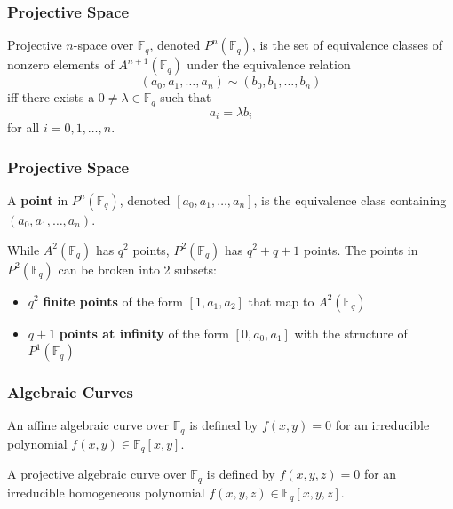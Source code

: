 \documentclass{beamer}
\begin{document}
    \begin{frame}
        \frametitle{Projective Space}
        \begin{definition}
            Projective \(n\)-space over \(\mathbb{F}_q\), denoted
            \(P^n(\mathbb{F}_q)\), is the set of equivalence classes of
            nonzero elements of \(A^{n+1}(\mathbb{F}_q)\) under the
            equivalence relation
            \[(a_0, a_1, \dots, a_n) \sim (b_0, b_1, \dots, b_n)\] iff there
            exists a \(0 \neq \lambda \in \mathbb{F}_q\) such that
            \[a_i = \lambda b_i\] for all \(i = 0, 1, \dots, n\).
        \end{definition}
    \end{frame}

    \begin{frame}
        \frametitle{Projective Space}
        \begin{definition}
            A \textbf{point} in \(P^n(\mathbb{F}_q)\), denoted
            \([a_0, a_1, \dots, a_n]\), is the equivalence class
            containing \((a_0, a_1, \dots, a_n)\).
        \end{definition}
        \vfill
        While \(A^2(\mathbb{F}_q)\) has \(q^2\) points,
        \(P^2(\mathbb{F}_q)\) has \(q^2 + q + 1\) points.
        \vfill
        The points in \(P^2(\mathbb{F}_q)\) can be broken into 2 subsets:
        \begin{itemize}
            \item \(q^2\) \textbf{finite points} of the form \([1, a_1, a_2]\)
            that map to \(A^2(\mathbb{F}_q)\)
            \item \(q+1\) \textbf{points at infinity} of the
            form \([0, a_0, a_1]\)
            with the structure of \(P^1(\mathbb{F}_q)\)
        \end{itemize}
    \end{frame}

    \begin{frame}
        \frametitle{Algebraic Curves}
        \begin{definition}
            An affine algebraic curve over \(\mathbb{F}_q\) is defined by
            \(f(x, y) = 0\) for an irreducible polynomial
            \(f(x, y) \in \mathbb{F}_q[x, y]\).
        \end{definition}
        \vfill
        \begin{definition}
            A projective algebraic curve over \(\mathbb{F}_q\) is defined by
            \(f(x, y, z) = 0\) for an irreducible homogeneous polynomial
            \(f(x, y, z) \in \mathbb{F}_q[x, y, z]\).
        \end{definition}
    \end{frame}
\end{document}
